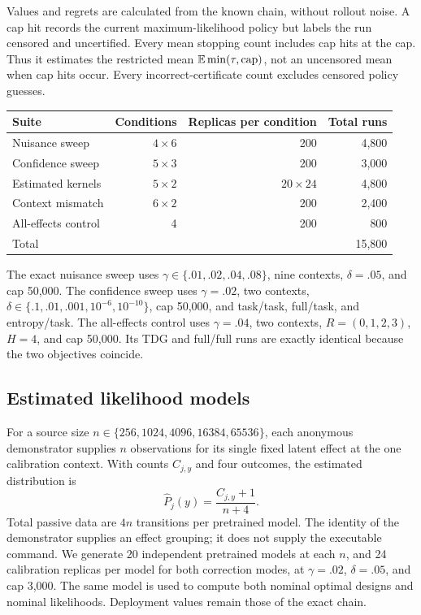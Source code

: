Values and regrets are calculated from the known chain, without rollout noise. A cap hit records the current maximum-likelihood policy but labels the run censored and uncertified. Every mean stopping count includes cap hits at the cap. Thus it estimates the restricted mean $\mathbb E\min(\tau,\mathrm{cap})$, not an uncensored mean when cap hits occur. Every incorrect-certificate count excludes censored policy guesses.

\begin{center}\small
\begin{tabular}{lrrr}\toprule
Suite & Conditions & Replicas per condition & Total runs\\\midrule
Nuisance sweep & $4\times6$ & 200 & 4,800\\
Confidence sweep & $5\times3$ & 200 & 3,000\\
Estimated kernels & $5\times2$ & $20\times24$ & 4,800\\
Context mismatch & $6\times2$ & 200 & 2,400\\
All-effects control & 4 & 200 & 800\\\midrule
Total &&&15,800\\\bottomrule
\end{tabular}
\end{center}
The exact nuisance sweep uses $\gamma\in\{.01,.02,.04,.08\}$, nine contexts, $\delta=.05$, and cap 50,000. The confidence sweep uses $\gamma=.02$, two contexts, $\delta\in\{.1,.01,.001,10^{-6},10^{-10}\}$, cap 50,000, and task/task, full/task, and entropy/task. The all-effects control uses $\gamma=.04$, two contexts, $R=(0,1,2,3)$, $H=4$, and cap 50,000. Its TDG and full/full runs are exactly identical because the two objectives coincide.

\subsection{Estimated likelihood models}
For a source size $n\in\{256,1024,4096,16384,65536\}$, each anonymous demonstrator supplies $n$ observations for its single fixed latent effect at the one calibration context. With counts $C_{j,y}$ and four outcomes, the estimated distribution is
\begin{equation}
\widehat P_j(y)=\frac{C_{j,y}+1}{n+4}.
\end{equation}
Total passive data are $4n$ transitions per pretrained model. The identity of the demonstrator supplies an effect grouping; it does not supply the executable command. We generate 20 independent pretrained models at each $n$, and 24 calibration replicas per model for both correction modes, at $\gamma=.02$, $\delta=.05$, and cap 3,000. The same model is used to compute both nominal optimal designs and nominal likelihoods. Deployment values remain those of the exact chain.


